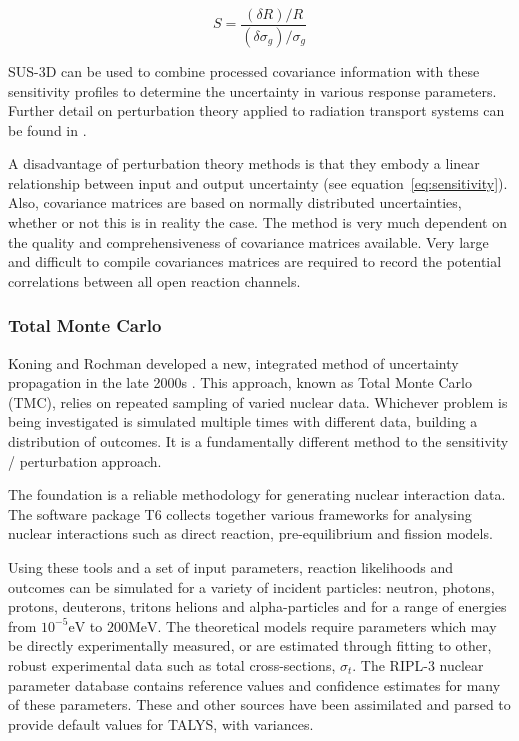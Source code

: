 \begin{equation}
  \label{eq:sensitivity}
  S = \frac{(\delta R)/R}{(\delta \sigma_{g}) / \sigma_{g}}
\end{equation}

SUS-3D can be used to combine processed covariance information with these sensitivity profiles to determine the uncertainty in various response parameters. Further detail on perturbation theory applied to radiation transport systems can be found in \cite{Sabouri2013}.

A disadvantage of perturbation theory methods is that they embody a linear relationship between input and output uncertainty (see equation~\ref{eq:sensitivity}). Also, covariance matrices are based on normally distributed uncertainties, whether or not this is in reality the case. The method is very much dependent on the quality and comprehensiveness of covariance matrices available. Very large and difficult to compile covariances matrices are required to record the potential correlations between all open reaction channels. 


\FloatBarrier
\subsubsection{Total Monte Carlo}
\label{subsubsec:tmc}
Koning and Rochman developed a new, integrated method of uncertainty propagation in the late 2000s \cite{Koning2008}. This approach, known as Total Monte Carlo (TMC), relies on repeated sampling of varied nuclear data. Whichever problem is being investigated is simulated multiple times with different data, building a distribution of outcomes. It is a fundamentally different method to the sensitivity / perturbation approach. 

The foundation is a reliable methodology for generating nuclear interaction data. The software package T6 \cite{Koning2005} collects together various frameworks for analysing nuclear interactions such as direct reaction, pre-equilibrium and fission models. 

Using these tools and a set of input parameters, reaction likelihoods and outcomes can be simulated for a variety of incident particles: neutron, photons, protons, deuterons, tritons helions and alpha-particles and for a range of energies from $10^{-5}\mathrm{eV}$ to $200\mathrm{MeV}$. The theoretical models require parameters which may be directly experimentally measured, or are estimated through fitting to other, robust experimental data such as total cross-sections, $\sigma_{t}$. The RIPL-3 nuclear parameter database \cite{Capote2009} contains reference values and confidence estimates for many of these parameters. These and other sources have been assimilated and parsed to provide default values for TALYS, with variances. 

